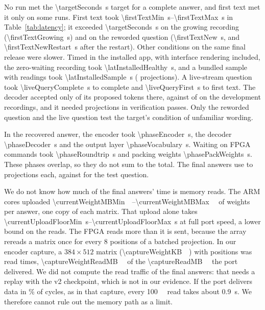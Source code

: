 \documentclass[conference,10pt,letterpaper]{IEEEtran}
\newcommand{\seconds}[1]{\SI{#1}{\second}}
\newcommand{\secrange}[2]{\SIrange{#1}{#2}{\second}}
\newcommand{\pct}[1]{#1\%}
\begin{document}
No run met the \seconds{\targetSeconds} target for a complete answer, and first text met it only on some runs. First text took \secrange{\firstTextMin}{\firstTextMax} in Table~\ref{tab:latency}; it exceeded \seconds{\targetSeconds} on the growing recording (\seconds{\firstTextGrowing}) and on the reworded question (\seconds{\firstTextNew}, and \seconds{\firstTextNewRestart} after the restart). Other conditions on the same final release were slower. Timed in the installed app, with interface rendering included, the zero-waiting recording took \seconds{\latInstalledHealthy}, and a bundled sample with \installedSampleReadings{} readings took \seconds{\latInstalledSample} (\installedSampleProjections{} projections). A live-stream question took \seconds{\liveQueryComplete} to complete and \seconds{\liveQueryFirst} to first text. The decoder accepted only \liveQueryAccepted{} of its \liveQueryProposed{} proposed tokens there, against \currentAccepted{} of \currentProposed{} on the development recordings, and it needed \liveQueryProjections{} projections in \liveQueryBlocks{} verification passes. Only the reworded question and the live question test the target's condition of unfamiliar wording.

In the recovered answer, the encoder took \seconds{\phaseEncoder}, the decoder \seconds{\phaseDecoder} and the output layer \seconds{\phaseVocabulary}. Waiting on \phaseCommands{} FPGA commands took \seconds{\phaseRoundtrip} and packing weights \seconds{\phasePackWeights}. These phases overlap, so they do not sum to the total. The final answers use \projectionsCurrentMin{} to \projectionsCurrentMax{} projections each, against \projectionsFloorCase{} for the test question.

We do not know how much of the final answers' time is memory reads. The ARM cores uploaded \SIrange{\currentWeightMBMin}{\currentWeightMBMax}{\mega\byte} of weights per answer, one copy of each matrix. That upload alone takes \secrange{\currentUploadFloorMin}{\currentUploadFloorMax} at full port speed, a lower bound on the reads. The FPGA reads more than it is sent, because the array rereads a matrix once for every 8 positions of a batched projection. In our encoder capture, a $384\times512$ matrix (\SI{\captureWeightKB}{\kilo\byte}) with \captureBatch{} positions was read \captureGroups{} times, \SI{\captureWeightReadMB}{\mega\byte} of the \SI{\captureReadMB}{\mega\byte} the port delivered. We did not compute the read traffic of the final answers: that needs a replay with the v2 checkpoint, which is not in our evidence. If the port delivers data in \pct{\ddrBeatEnc} of cycles, as in that capture, every \SI{100}{\mega\byte} read takes about \seconds{0.9}. We therefore cannot rule out the memory path as a limit.
\end{document}
